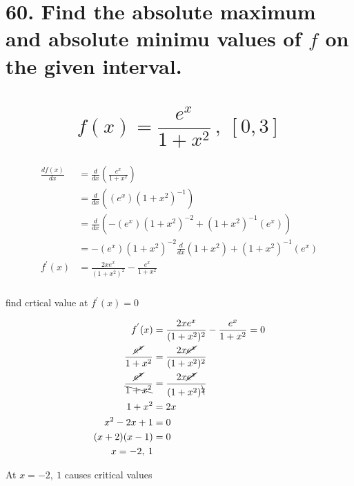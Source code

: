 \section*{
    \textbf{60.
        Find the absolute maximum and absolute minimu values of $f$ on the given interval.
}
    \\ \\
\[
    f(x) = \frac{e^x}{1 + x^2} \: , \: [0,3]
\]
}

\begin{align}
\begin{split}
    \frac {df(x)}{dx}
    &=
        \frac{d}{dx}
        \left(
        \frac{e^x}{1 + x^2}
        \right)
        \\
    &=
        \frac{d}{dx}
        \left(
        (e^x)(1+x^2)^{-1}
        \right)
        \\
    &=
        \frac{d}{dx}
        \left(
            -(e^x)(1+x^2)^{-2} +
            (1+x^2)^{-1}(e^x)
        \right)
        \\
    &=
    -(e^x)(1+x^2)^{-2} \frac{d}{dx}(1+x^2) +
            (1+x^2)^{-1}(e^x)
        \\
    f^{'}(x)
    &= \frac{2xe^x}{(1+x^2)^2} - \frac{e^x}{1+x^2}
    \\
\nonumber
\end{split}
\end{align}

find crtical value at
    $f^{'}(x) = 0$

\begin{align}
\begin{split}
    f^{'}(x)
    &= \frac{2xe^x}{(1+x^2)^2} - \frac{e^x}{1+x^2}
    = 0
    \\
    \frac{\cancel{e^x}}{1+x^2}
    &= \frac{2x\cancel{e^x}}{(1+x^2)^2}
    \\
    \frac{\cancel{e^x}}{\bcancel{1+x^2}}
    &= \frac{2x\cancel{e^x}}{(1+x^2)^{\bcancel{2}}}
    \\
    1+x^2 &= 2x
    \\
    x^2 - 2x + 1 &= 0
    \\
    (x + 2)(x - 1) &= 0
    \\
    x = -2, \: 1
\notag
\end{split}
\end{align}

At $x = -2, \: 1$ causes critical values


